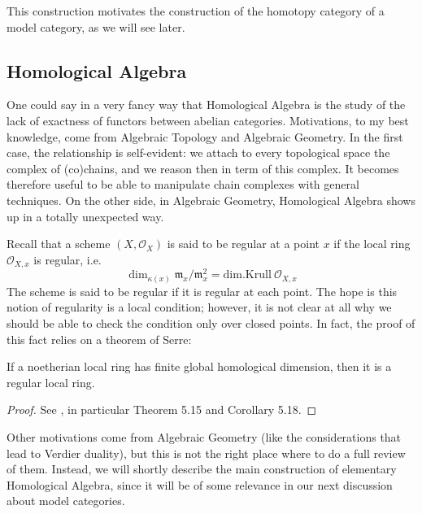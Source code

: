 This construction motivates the construction of the homotopy category of a model category, as we will see later.

\subsection{Homological Algebra}

One could say in a very fancy way that Homological Algebra is the study of the lack of exactness of functors between abelian categories. Motivations, to my best knowledge, come from Algebraic Topology and Algebraic Geometry. In the first case, the relationship is self-evident: we attach to every topological space the complex of (co)chains, and we reason then in term of this complex. It becomes therefore useful to be able to manipulate chain complexes with general techniques. On the other side, in Algebraic Geometry, Homological Algebra shows up in a totally unexpected way.

Recall that a scheme $(X,\mathscr O_X)$ is said to be regular at a point $x$ if the local ring $\mathscr O_{X,x}$ is regular, i.e.
\[
\dim_{\kappa(x)} \mathfrak m_x / \mathfrak m_x^2 = \mathrm{dim.Krull } \: \mathscr O_{X,x}
\]
The scheme is said to be regular if it is regular at each point. The hope is this notion of regularity is a local condition; however, it is not clear at all why we should be able to check the condition only over closed points. In fact, the proof of this fact relies on a theorem of Serre:

\begin{thm} \label{thm regularity}
If a noetherian local ring has finite global homological dimension, then it is a regular local ring.
\end{thm}

\begin{proof}
See \cite{altman}, in particular Theorem 5.15 and Corollary 5.18.
\end{proof}

Other motivations come from Algebraic Geometry (like the considerations that lead to Verdier duality), but this is not the right place where to do a full review of them. Instead, we will shortly describe the main construction of elementary Homological Algebra, since it will be of some relevance in our next discussion about model categories.

